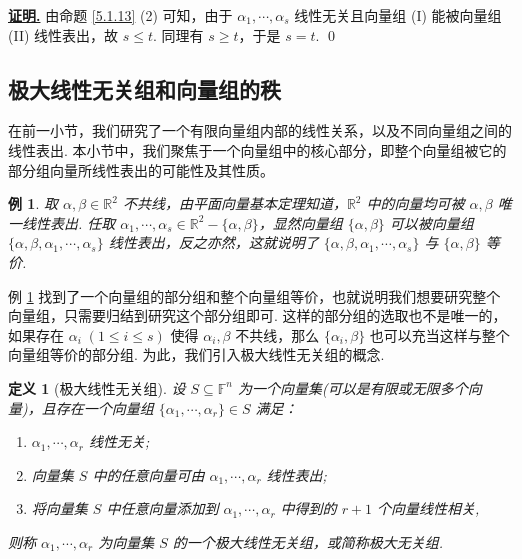 \documentclass[10pt,openany]{article}
\theoremstyle{thmstyle} %
\theoremstyle{defstyle} %
\newtheorem{definition}[theorem]{定义}
\theoremstyle{prostyle} %
\theoremstyle{exastyle}
\newtheorem{example}[theorem]{例}
\theoremstyle{remstyle}
\renewenvironment{proof}[1][证明]{\par\underline{\textbf{#1.}} \;\fangsong}{\qed\par}
\newcommand{\F}{\mathbb{F}}
\begin{document}
\begin{proof}
	由命题 \ref{5.1.13} (2) 可知，由于 \( \alpha_1,\cdots,\alpha_s \) 线性无关且向量组 (I) 能被向量组 (II) 线性表出，故 \( s \leq t \). 同理有 \( s \geq t \)，于是 \( s=t \).
\end{proof}

\subsection{极大线性无关组和向量组的秩}

在前一小节，我们研究了一个有限向量组内部的线性关系，以及不同向量组之间的线性表出. 本小节中，我们聚焦于一个向量组中的核心部分，即整个向量组被它的部分组向量所线性表出的可能性及其性质。

\begin{example} \label{5.2.1}
	取 \( \alpha,\beta \in \mathbb{R}^2 \) 不共线，由平面向量基本定理知道，\( \mathbb{R}^2 \) 中的向量均可被 \( \alpha, \beta \) 唯一线性表出. 任取 \( \alpha_1,\cdots,\alpha_s \in \mathbb{R}^2-\{ \alpha, \beta \} \)，显然向量组 \( \{\alpha,\beta\} \) 可以被向量组 \( \{\alpha, \beta,\alpha_1,\cdots,\alpha_s\} \) 线性表出，反之亦然，这就说明了 \( \{\alpha, \beta,\alpha_1,\cdots,\alpha_s\} \) 与 \( \{\alpha,\beta\} \) 等价.
\end{example}

例 \ref{5.2.1} 找到了一个向量组的部分组和整个向量组等价，也就说明我们想要研究整个向量组，只需要归结到研究这个部分组即可. 这样的部分组的选取也不是唯一的，如果存在 \( \alpha_i \; (1\leqslant i \leq s) \) 使得 \( \alpha_i, \beta \) 不共线，那么 \( \{\alpha_i,\beta\} \) 也可以充当这样与整个向量组等价的部分组. 为此，我们引入极大线性无关组的概念.

\begin{definition}[极大线性无关组] \label{5.2.2}
	设 \( S \subseteq \F^n \) 为一个向量集(可以是有限或无限多个向量)，且存在一个向量组 \( \{\alpha_1,\cdots,\alpha_r\} \in S \) 满足：
	\begin{enumerate}[(1)]
		\item \( \alpha_1,\cdots,\alpha_r \) 线性无关;
		\item 向量集 \( S \) 中的任意向量可由 \( \alpha_1,\cdots,\alpha_r \) 线性表出;
		\item[{\color{red} (2')}] 将向量集 \( S \) 中任意向量添加到 \( \alpha_1,\cdots,\alpha_r \) 中得到的 \( r+1 \) 个向量线性相关,
	\end{enumerate}
	则称 \( \alpha_1,\cdots,\alpha_r \) 为向量集 \( S \) 的一个极大线性无关组，或简称极大无关组.
\end{definition}
\end{document}
